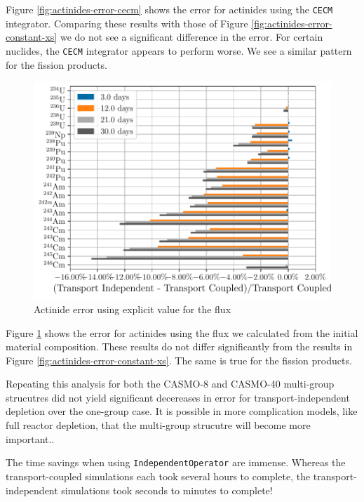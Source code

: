     Figure \ref{fig:actinides-error-cecm} shows the error for actinides using the
    \verb.CECM. integrator. Comparing these results with those of Figure
    \ref{fig:actinides-error-constant-xs} we do not see a significant difference
    in the error. For certain nuclides, the \verb.CECM. integrator appears to
    perform worse. We see a similar pattern for the fission products.

    \begin{figure}[htpb]
        \centering
        \includegraphics[width=\linewidth]{figs/actinides_constant_xs_predictor_source_rate_days.pdf}
        \caption{Actinide error using explicit value for the flux}
        \label{fig:actinides-error-source}
    \end{figure}

    Figure \ref{fig:actinides-error-source} shows the error for actinides using
    the flux we calculated from the initial material composition. These results
    do not differ significantly from the results in Figure
    \ref{fig:actinides-error-constant-xs}. The same is true for the fission
    products.

    Repeating this analysis for both the CASMO-8 and CASMO-40 multi-group
    strucutres did not yield significant decereases in error for
    transport-independent depletion over the one-group case. It is possible in
    more complication models, like full reactor depletion, that the multi-group
    strucutre will become more important..

    The time savings when using \verb.IndependentOperator. are immense. Whereas
    the transport-coupled simulations each took several hours to complete, the
    transport-independent simulations took seconds to minutes to complete!



